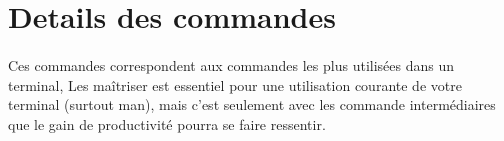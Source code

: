 \documentclass[french, a4paper, 12pt, titlepage]{article}
\begin{document}
\section{Details des commandes}








\vspace{7em}

\paragraph{} Ces commandes correspondent aux commandes les plus utilisées dans
un terminal,
Les maîtriser est essentiel pour une utilisation courante de votre terminal
(surtout man), mais c'est seulement avec les commande intermédiaires que le
gain de productivité pourra se faire ressentir.

\newpage
\end{document}
